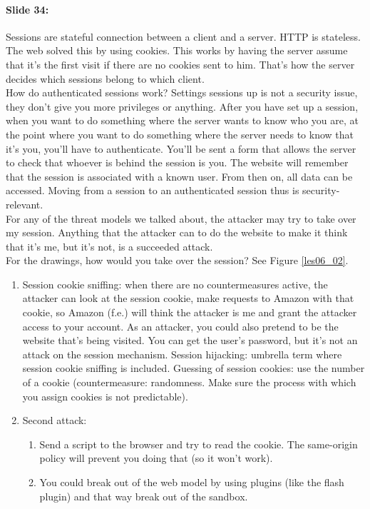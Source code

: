 \documentclass[10pt,a4paper]{report}
\begin{document}
\paragraph{Slide 34:} Sessions are stateful connection between a client and a server. HTTP is stateless. The web solved this by using cookies. This works by having the server assume that it's the first visit if there are no cookies sent to him. That's how the server decides which sessions belong to which client. \\
How do authenticated sessions work? Settings sessions up is not a security issue, they don't give you more privileges or anything. After you have set up a session, when you want to do something where the server wants to know who you are, at the point where you want to do something where the server needs to know that it's you, you'll have to authenticate. You'll be sent a form that allows the server to check that whoever is behind the session is you. The website will remember that the session is associated with a known user. From then on, all data can be accessed. Moving from a session to an authenticated session thus is security-relevant.\\
For any of the threat models we talked about, the attacker may try to take over my session. Anything that the attacker can to do the website to make it think that it's me, but it's not, is a succeeded attack. \\
For the drawings, how would you take over the session? See Figure \ref{les06_02}.
\begin{enumerate}
\item Session cookie sniffing: when there are no countermeasures active, the attacker can look at the session cookie, make requests to Amazon with that cookie, so Amazon (f.e.) will think the attacker is me and grant the attacker access to your account. As an attacker, you could also pretend to be the website that's being visited. You can get the user's password, but it's not an attack on the session mechanism. Session hijacking: umbrella term where session cookie sniffing is included. Guessing of session cookies: use the number of a cookie (countermeasure: randomness. Make sure the process with which you assign cookies is not predictable). 
\item Second attack:
\begin{enumerate}
\item Send a script to the browser and try to read the cookie. The same-origin policy will prevent you doing that (so it won't work). 
\item You could break out of the web model by using plugins (like the flash plugin) and that way break out of the sandbox. 
\end{enumerate}
\end{enumerate}
\end{document}
